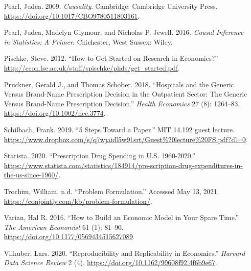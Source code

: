 \documentclass[
]{book}
\begin{document}
\leavevmode\hypertarget{ref-pearl_causality_2009}{}%
Pearl, Judea. 2009. \emph{Causality}. Cambridge: Cambridge University
Press. \url{https://doi.org/10.1017/CBO9780511803161}.

\leavevmode\hypertarget{ref-pearl_causal_2016}{}%
Pearl, Judea, Madelyn Glymour, and Nicholas P. Jewell. 2016.
\emph{Causal Inference in Statistics: A Primer}. Chichester, West
Sussex: Wiley.

\leavevmode\hypertarget{ref-pischke_how_2012}{}%
Pischke, Steve. 2012. ``How to Get Started on Research in Economics?''
\url{http://econ.lse.ac.uk/staff/spischke/phds/get_started.pdf}.

\leavevmode\hypertarget{ref-pruckner_hospitals_2018}{}%
Pruckner, Gerald J., and Thomas Schober. 2018. ``Hospitals and the
Generic Versus Brand-Name Prescription Decision in the Outpatient
Sector: The Generic Versus Brand-Name Prescription Decision.''
\emph{Health Economics} 27 (8): 1264--83.
\url{https://doi.org/10.1002/hec.3774}.

\leavevmode\hypertarget{ref-schilbach_5_2019}{}%
Schilbach, Frank. 2019. ``5 Steps Toward a Paper.'' MIT 14.192 guest
lecture.
\url{https://www.dropbox.com/s/q7wjaidl5w91srt/Guest\%20lecture\%20FS.pdf?dl=0}.

\leavevmode\hypertarget{ref-statista_prescription_2020}{}%
Statista. 2020. ``Prescription Drug Spending in U.S. 1960-2020.''
\url{https://www.statista.com/statistics/184914/pre-scription-drug-expenditures-in-the-us-since-1960/}.

\leavevmode\hypertarget{ref-trochim_problem_nodate}{}%
Trochim, William. n.d. ``Problem Formulation.'' Accessed May 13, 2021.
\url{https://conjointly.com/kb/problem-formulation/}.

\leavevmode\hypertarget{ref-varian_how_2016}{}%
Varian, Hal R. 2016. ``How to Build an Economic Model in Your Spare
Time.'' \emph{The American Economist} 61 (1): 81--90.
\url{https://doi.org/10.1177/0569434515627089}.

\leavevmode\hypertarget{ref-vilhuber_reproducibility_2020}{}%
Vilhuber, Lars. 2020. ``Reproducibility and Replicability in
Economics.'' \emph{Harvard Data Science Review} 2 (4).
\url{https://doi.org/10.1162/99608f92.4f6b9e67}.

\backmatter
\end{document}
